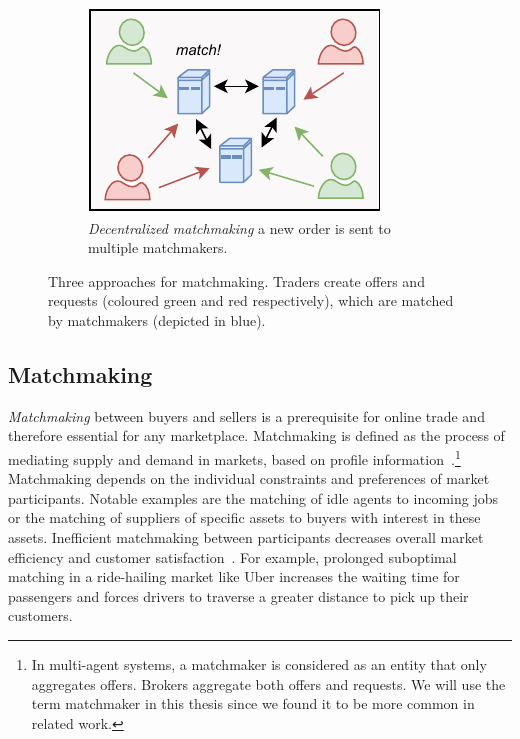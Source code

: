 \begin{figure}[t]
\begin{subfigure}[t]{.33\textwidth}
		\includegraphics[width=.9\linewidth]{introduction/assets/decentralized_matchmaking}
		\caption{\emph{Decentralized matchmaking} a new order is sent to multiple matchmakers.}
		\label{fig:decentralized_matchmaking}
	\end{subfigure}
	\caption{Three approaches for matchmaking. Traders create offers and requests (coloured green and red respectively), which are matched by matchmakers (depicted in blue).}
	\label{fig:matching_architectures}
\end{figure}

\subsection{Matchmaking}
\label{sec:matchmaking}
\emph{Matchmaking} between buyers and sellers is a prerequisite for online trade and therefore essential for any marketplace.
Matchmaking is defined as the process of mediating supply and demand in markets, based on profile information~\cite{veit2003matchmaking}.\footnote{In multi-agent systems, a matchmaker is considered as an entity that only aggregates offers. Brokers aggregate both offers and requests. We will use the term matchmaker in this thesis since we found it to be more common in related work.}
Matchmaking depends on the individual constraints and preferences of market participants.
Notable examples are the matching of idle agents to incoming jobs or the matching of suppliers of specific assets to buyers with interest in these assets.
Inefficient matchmaking between participants decreases overall market efficiency and customer satisfaction~\cite{Wu2015TheM}.
For example, prolonged suboptimal matching in a ride-hailing market like Uber increases the waiting time for passengers and forces drivers to traverse a greater distance to pick up their customers.

